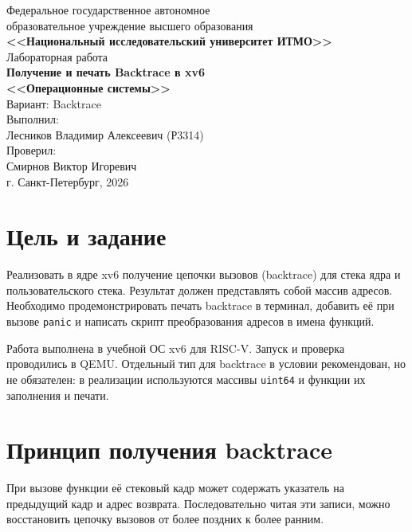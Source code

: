 \documentclass[12pt,a4paper]{article}
\begin{document}
\hypersetup{pageanchor=false}
\begin{titlepage}
    \centering
    Федеральное государственное автономное \\
    образовательное учреждение высшего образования \\
    \textbf{<<Национальный исследовательский университет ИТМО>>} \\
    \vfill
    Лабораторная работа \\
    \vspace{0.5\baselineskip}
    \textbf{Получение и печать Backtrace в xv6} \\
    \textbf{<<Операционные системы>>} \\
    \vspace{0.5\baselineskip}
    Вариант: Backtrace \\
    \vfill
    \flushright
    Выполнил:\\
    Лесников Владимир Алексеевич (Р3314) \\
    \vspace{0.5\baselineskip}
    Проверил:\\
    Смирнов Виктор Игоревич \\
    \vspace{3\baselineskip}
    \centering
    г. Санкт-Петербург, 2026
\end{titlepage}
\hypersetup{pageanchor=true}
\tableofcontents
\newpage

\section{Цель и задание}

Реализовать в ядре xv6 получение цепочки вызовов (backtrace) для стека ядра и пользовательского стека. Результат должен представлять собой массив адресов. Необходимо продемонстрировать печать backtrace в терминал, добавить её при вызове \texttt{panic} и написать скрипт преобразования адресов в имена функций.

Работа выполнена в учебной ОС xv6 для RISC-V. Запуск и проверка проводились в QEMU. Отдельный тип для backtrace в условии рекомендован, но не обязателен: в реализации используются массивы \texttt{uint64} и функции их заполнения и печати.

\section{Принцип получения backtrace}

При вызове функции её стековый кадр может содержать указатель на предыдущий кадр и адрес возврата. Последовательно читая эти записи, можно восстановить цепочку вызовов от более поздних к более ранним.
\end{document}
